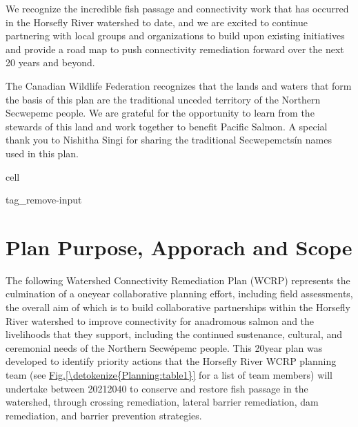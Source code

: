 \documentclass[letterpaper,10pt,english]{jupyterBook}
\begin{document}
\sphinxAtStartPar
We recognize the incredible fish passage and connectivity work that has occurred in the Horsefly River watershed to date, and we are excited to continue partnering with local groups and organizations to build upon existing initiatives and provide a road map to push connectivity remediation forward over the next 20 years and beyond.

\sphinxAtStartPar
The Canadian Wildlife Federation recognizes that the lands and waters that form the basis of this plan are the traditional unceded territory of the Northern Secwepemc people. We are grateful for the opportunity to learn from the stewards of this land and work together to benefit Pacific Salmon. A special thank you to Nishitha Singi for sharing the traditional Secwepemctsín names used in this plan.

\begin{sphinxuseclass}{cell}
\begin{sphinxuseclass}{tag_remove-input}
\end{sphinxuseclass}
\end{sphinxuseclass}
\sphinxstepscope


\chapter{Plan Purpose, Apporach and Scope}
\label{\detokenize{Planning:plan-purpose-apporach-and-scope}}\label{\detokenize{Planning::doc}}
\sphinxAtStartPar
The following Watershed Connectivity Remediation Plan (WCRP) represents the culmination of a one\sphinxhyphen{}year collaborative planning effort, including field assessments, the overall aim of which is to build collaborative partnerships within the Horsefly River watershed to improve connectivity for anadromous salmon and the livelihoods that they support, including the continued sustenance, cultural, and ceremonial needs of the Northern Secwépemc people. This 20\sphinxhyphen{}year plan was developed to identify priority actions that the Horsefly River WCRP planning team (see \hyperref[\detokenize{Planning:table1}]{Fig.\@ \ref{\detokenize{Planning:table1}}} for a list of team members) will undertake between 2021\sphinxhyphen{}2040 to conserve and restore fish passage in the watershed, through crossing remediation, lateral barrier remediation, dam remediation, and barrier prevention strategies.
\end{document}
